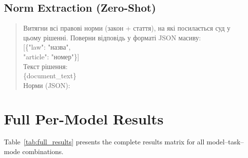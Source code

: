 \documentclass[11pt,a4paper]{article}
\begin{document}
\subsection{Norm Extraction (Zero-Shot)}

\begin{quote}\small\ttfamily
\foreignlanguage{ukrainian}{Витягни всі правові норми (закон + стаття),
на які посилається суд у цьому рішенні.
Поверни відповідь у форматі JSON масиву:}\\
{[}\{"law": "\foreignlanguage{ukrainian}{назва}",\\
\hspace*{1em}"article": "\foreignlanguage{ukrainian}{номер}"\}{]}\\[6pt]
\foreignlanguage{ukrainian}{Текст рішення:}\\
\{document\_text\}\\[6pt]
\foreignlanguage{ukrainian}{Норми (JSON):}
\end{quote}

\section{Full Per-Model Results}
\label{app:full_results}

Table~\ref{tab:full_results} presents the complete results matrix for all model--task--mode combinations.
\end{document}
